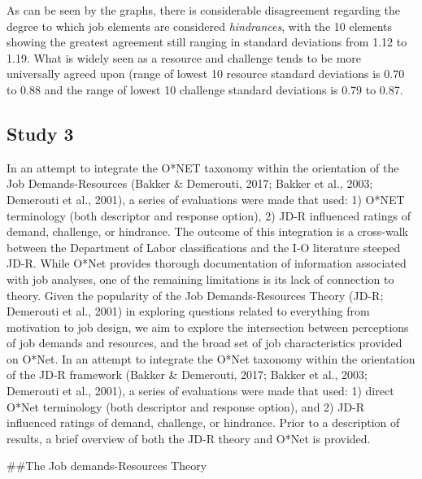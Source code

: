 \documentclass[
  english,
  man]{apa6}
\begin{document}
As can be seen by the graphs, there is considerable disagreement regarding the degree to which job elements are considered \emph{hindrances}, with the 10 elements showing the greatest agreement still ranging in standard deviations from 1.12 to 1.19. What is widely seen as a resource and challenge tends to be more universally agreed upon (range of lowest 10 resource standard deviations is 0.70 to 0.88 and the range of lowest 10 challenge standard deviations is 0.79 to 0.87.

\hypertarget{study-3}{%
\subsection{Study 3}\label{study-3}}

In an attempt to integrate the O*NET taxonomy within the orientation of the Job Demands-Resources (Bakker \& Demerouti, 2017; Bakker et al., 2003; Demerouti et al., 2001), a series of evaluations were made that used: 1) O*NET terminology (both descriptor and response option), 2) JD-R influenced ratings of demand, challenge, or hindrance. The outcome of this integration is a cross-walk between the Department of Labor classifications and the I-O literature steeped JD-R. While O*Net provides thorough documentation of information associated with job analyses, one of the remaining limitations is its lack of connection to theory. Given the popularity of the Job Demands-Resources Theory (JD-R; Demerouti et al., 2001) in exploring questions related to everything from motivation to job design, we aim to explore the intersection between perceptions of job demands and resources, and the broad set of job characteristics provided on O*Net. In an attempt to integrate the O*Net taxonomy within the orientation of the JD-R framework (Bakker \& Demerouti, 2017; Bakker et al., 2003; Demerouti et al., 2001), a series of evaluations were made that used: 1) direct O*Net terminology (both descriptor and response option), and 2) JD-R influenced ratings of demand, challenge, or hindrance. Prior to a description of results, a brief overview of both the JD-R theory and O*Net is provided.

\#\#The Job demands-Resources Theory
\end{document}
